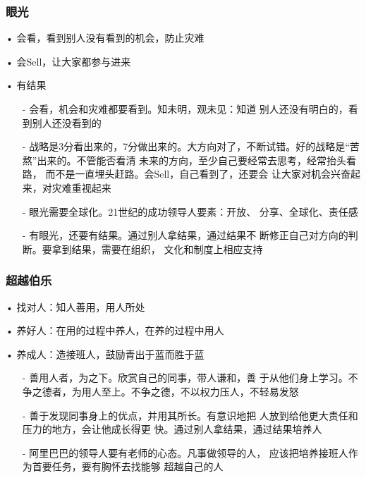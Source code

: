\documentclass[12pt]{article}
\begin{document}
\subsubsection{眼光}
• 会看，看到别人没有看到的机会，防止灾难

• 会Sell，让大家都参与进来

• 有结果
\begin{itemize}
\setlength{\itemsep}{0pt}
\setlength{\parsep}{0pt}
\setlength{\parskip}{0pt}
    \item[-] 会看，机会和灾难都要看到。知未明，观未见：知道 别人还没有明白的，看到别人还没看到的
    \item[-] 战略是3分看出来的，7分做出来的。大方向对了，不断试错。好的战略是“苦熬”出来的。不管能否看清 未来的方向，至少自己要经常去思考，经常抬头看路， 而不是一直埋头赶路。会Sell，自己看到了，还要会 让大家对机会兴奋起来，对灾难重视起来
    \item[-] 眼光需要全球化。21世纪的成功领导人要素：开放、 分享、全球化、责任感
    \item[-] 有眼光，还要有结果。通过别人拿结果，通过结果不 断修正自己对方向的判断。要拿到结果，需要在组织， 文化和制度上相应支持
\end{itemize}

\subsubsection{超越伯乐}
• 找对人：知人善用，用人所处

• 养好人：在用的过程中养人，在养的过程中用人

• 养成人：造接班人，鼓励青出于蓝而胜于蓝
\begin{itemize}
\setlength{\itemsep}{0pt}
\setlength{\parsep}{0pt}
\setlength{\parskip}{0pt}
    \item[-] 善用人者，为之下。欣赏自己的同事，带人谦和，善 于从他们身上学习。不争之德者，为用人至上。不争之德，不以权力压人，不轻易发怒
    \item[-] 善于发现同事身上的优点，并用其所长。有意识地把 人放到给他更大责任和压力的地方，会让他成长得更 快。通过别人拿结果，通过结果培养人
    \item[-] 阿里巴巴的领导人要有老师的心态。凡事做领导的人， 应该把培养接班人作为首要任务，要有胸怀去找能够 超越自己的人
\end{itemize}
\end{document}
